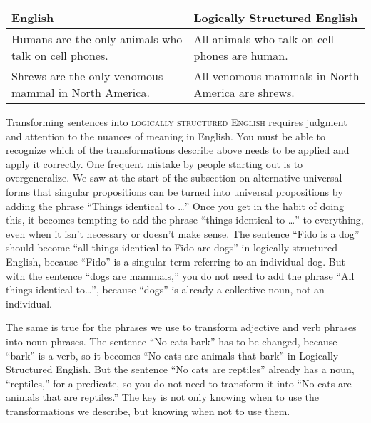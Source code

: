 \begin{table*}
\begin{longtabu}{p{.5\linewidth}p{.5\linewidth}}
\underline{English} & \underline{Logically Structured English} \\
\endhead
Humans are the only animals who talk on cell phones. & All animals who talk on cell phones are human.\\
Shrews are the only venomous mammal in North America. & All venomous mammals in North America are shrews.\\
\end{longtabu}
\end{table*}

Transforming sentences into \textsc{\gls{logically structured English}} requires judgment and attention to the nuances of meaning in English. You must be able to recognize which of the transformations describe above needs to be applied and apply it correctly. One frequent mistake by people starting out is to overgeneralize. We saw at the start of the subsection on alternative universal forms that singular propositions can be turned into universal propositions by adding the phrase ``Things identical to \ldots'' Once you get in the habit of doing this, it becomes tempting to add the phrase ``things identical to \ldots'' to everything, even when it isn't necessary or doesn't make sense. The sentence ``Fido is a dog'' should become ``all things identical to Fido are dogs'' in logically structured English, because ``Fido'' is a singular term referring to an individual dog. But with the sentence ``dogs are mammals,'' you do not need to add the phrase ``All things identical to\ldots'', because ``dogs'' is already a collective noun, not an individual.

The same is true for the phrases we use to transform adjective and verb phrases into noun phrases. The sentence ``No cats bark'' has to be changed, because ``bark'' is a verb, so it becomes ``No cats are animals that bark'' in Logically Structured English. But the sentence ``No cats are reptiles'' already has a noun, ``reptiles,'' for a predicate, so you do not need to transform it into ``No cats are animals that are reptiles.'' The key is not only knowing when to use the transformations we describe, but knowing when not to use them.



